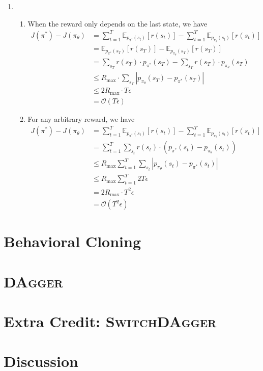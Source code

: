 \documentclass[12pt]{article}
\newcommand{\E}{\mathbb{E}}
\newcommand\abs[1]{\left| #1 \right|} %
\begin{document}
\begin{enumerate}
    \item \begin{enumerate}
      \item When the reward only depends on the last state, we have 
      \begin{align*}
        J(\pi^*) - J(\pi_\theta) &= \sum_{t=1}^T \E_{p_{\pi^*}(s_t)}[r(s_t)] - \sum_{t=1}^T \E_{p_{\pi_\theta}(s_t)}[r(s_t)] \\
        &= \E_{p_{\pi^*}(s_T)}[r(s_T)] - \E_{p_{\pi_\theta}(s_T)}[r(s_T)] \\
        &= \sum_{s_T} r(s_T) \cdot p_{\pi^*}(s_T) - \sum_{s_T} r(s_T) \cdot p_{\pi_\theta}(s_T) \\
        &\leq R_{\mathrm{max}} \cdot \sum_{s_T} \abs{p_{\pi_\theta}(s_T) - p_{\pi^*}(s_T)} \\
        &\leq 2R_{\mathrm{max}} \cdot T \epsilon \\
        &= \mathcal{O}(T\epsilon )
      \end{align*}

      \item For any arbitrary reward, we have 
      \begin{align*}
        J(\pi^*) - J(\pi_\theta) &= \sum_{t=1}^T \E_{p_{\pi^*}(s_t)}[r(s_t)] - \sum_{t=1}^T \E_{p_{\pi_\theta}(s_t)}[r(s_t)] \\
        &= \sum_{t=1}^T \sum_{s_t} r(s_t) \cdot (p_{\pi^*}(s_t) - p_{\pi_\theta}(s_t)) \\
        &\leq R_{\mathrm{max}}\sum_{t=1}^T \sum_{s_t} \abs{p_{\pi_\theta}(s_t) - p_{\pi^*}(s_t)} \\
        &\leq R_{\mathrm{max}} \sum_{t=1}^T 2T\epsilon \\
        &= 2R_{\mathrm{max}} \cdot T^2 \epsilon \\
        &= \mathcal{O}(T^2 \epsilon)
      \end{align*}
    \end{enumerate}
\end{enumerate}

\section{Behavioral Cloning}



\section{\textsc{DAgger}}

\section{Extra Credit: \textsc{SwitchDAgger}}

\section{Discussion}
\end{document}
